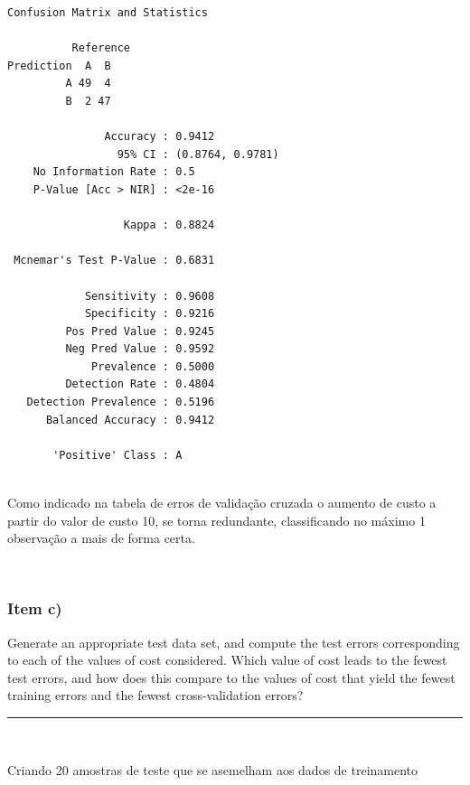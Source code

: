 \documentclass[
  a4paperpaper,
]{article}
\begin{document}
\begin{verbatim}
Confusion Matrix and Statistics

          Reference
Prediction  A  B
         A 49  4
         B  2 47
                                          
               Accuracy : 0.9412          
                 95% CI : (0.8764, 0.9781)
    No Information Rate : 0.5             
    P-Value [Acc > NIR] : <2e-16          
                                          
                  Kappa : 0.8824          
                                          
 Mcnemar's Test P-Value : 0.6831          
                                          
            Sensitivity : 0.9608          
            Specificity : 0.9216          
         Pos Pred Value : 0.9245          
         Neg Pred Value : 0.9592          
             Prevalence : 0.5000          
         Detection Rate : 0.4804          
   Detection Prevalence : 0.5196          
      Balanced Accuracy : 0.9412          
                                          
       'Positive' Class : A               
                                          
\end{verbatim}

Como indicado na tabela de erros de validação cruzada o aumento de custo
a partir do valor de custo 10, se torna redundante, classificando no
máximo 1 observação a mais de forma certa.

~

\subsubsection{Item c)}\label{item-c-2}

Generate an appropriate test data set, and compute the test errors
corresponding to each of the values of cost considered. Which value of
cost leads to the fewest test errors, and how does this compare to the
values of cost that yield the fewest training errors and the fewest
cross-validation errors?

\begin{center}\rule{0.5\linewidth}{0.5pt}\end{center}

~

Criando 20 amostras de teste que se asemelham aos dados de treinamento
\end{document}
